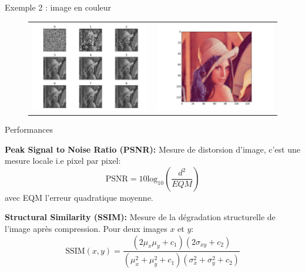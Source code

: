 \documentclass{beamer}
\begin{document}
\begin{frame}{Exemple 2 : image en couleur}
\begin{center}
\begin{figure}
\begin{tiny}
\begin{tabular}{cc}
\includegraphics[scale=0.23]{images/lena_128_4_8/lena_b.png} & 
\includegraphics[scale=0.23]{images/lena_128_4_8/lena_128_4_8.png} \\
\end{tabular}
\end{tiny}
\end{figure}
\end{center}
\end{frame}

\begin{frame}{Performances}
	\begin{definition}{\textbf{Peak Signal to Noise Ratio (PSNR):}}
	Mesure de distorsion d'image, c'est une mesure locale i.e pixel par pixel:
	$$\text{PSNR} = 10\text{log}_{10}(\frac{d^2}{EQM})$$
	avec EQM l'erreur quadratique moyenne.
	\end{definition}
	\begin{definition}{\textbf{Structural Similarity (SSIM):}}
	Mesure de la dégradation structurelle de l'image après compression.
	Pour deux images $x$ et $y$:
	$$\text{SSIM}(x, y) = \frac{(2\mu_x\mu_y + c_1)(2\sigma_{xy} + c_2)}{(\mu_{x}^2 + \mu_{y}^2 + c_1)(\sigma_{x}^2 + \sigma_{y}^2 + c_2)} $$
	\end{definition}

\end{frame}
\end{document}
